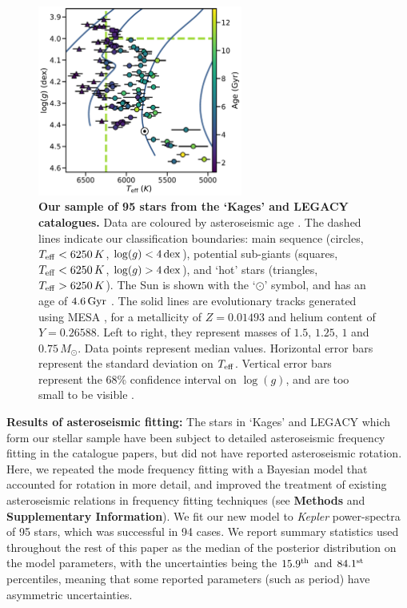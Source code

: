 \documentclass[12pt]{article}
\newcommand{\teff}{\mbox{$T_{\rm eff}$}\xspace}
\newcommand{\logg}{\mbox{$\log(g)$}\xspace}
\newcommand{\kepler}{\emph{Kepler}\xspace}
\begin{document}
\begin{figure}[h!]
	\centering
	\includegraphics[width=0.6\textwidth]{data_Fig1.pdf}
	\caption{\textbf{Our sample of 95 stars from the `Kages' and LEGACY catalogues.} Data are coloured by asteroseismic age  \cite{silvaaguirre+2015, silvaaguirre+2017}. The dashed lines indicate our classification boundaries: main sequence (circles, $\teff < 6250\, K$, $\logg < 4\, \rm{dex}$), potential sub-giants (squares, $\teff < 6250\, K$, $\logg > 4\, \rm{dex}$), and `hot' stars (triangles, $\teff > 6250\, K$). The Sun is shown with the `$\odot$' symbol, and has an age of $4.6\, \rm{Gyr}$ \cite{bonanno+frohlich2015}. The solid lines are evolutionary tracks generated using MESA \cite{paxton+2017}, for a metallicity of $Z = 0.01493$ and helium content of $Y = 0.26588$. Left to right, they represent masses of $1.5$, $1.25$, $1$ and $0.75\, M_\odot$. Data points represent median values. Horizontal error bars represent the standard deviation on \teff. Vertical error bars represent the 68\% confidence interval on \logg, and are too small to be visible \cite{hunter2007}.}
	\label{fig:sample}
\end{figure}


\textbf{Results of asteroseismic fitting:} The stars in `Kages' and LEGACY which form our stellar sample have been subject to detailed asteroseismic frequency fitting in the catalogue papers, but did not have reported asteroseismic rotation. Here, we repeated the mode frequency fitting with a Bayesian model that accounted for rotation in more detail, and improved the treatment of existing asteroseismic relations in frequency fitting techniques (see \textbf{Methods} and \textbf{Supplementary Information}). We fit our new model to \kepler power-spectra of 95 stars, which was successful in 94 cases. We report summary statistics used throughout the rest of this paper as the median of the posterior distribution on the model parameters, with the uncertainties being the $15.9^{\rm th}$ and $84.1^{\rm st}$ percentiles, meaning that some reported parameters (such as period) have asymmetric uncertainties.
\end{document}
